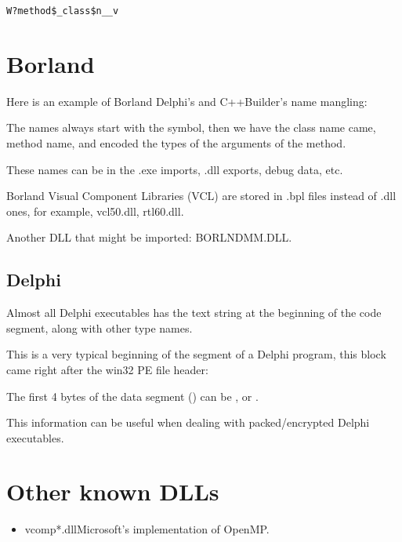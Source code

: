 \begin{lstlisting}
W?method$_class$n__v
\end{lstlisting}

\section{Borland}

Here is an example of Borland Delphi's and C++Builder's \gls{name mangling}:



The names always start with the  
symbol, then we have the class name came, method name, and encoded the types of the arguments of the method.

These names can be in the .exe imports, .dll exports, debug data, etc.

Borland Visual Component Libraries (VCL) 
are stored in .bpl files instead of .dll ones, for example, vcl50.dll, rtl60.dll.

Another DLL that might be imported: BORLNDMM.DLL.

\subsection{Delphi}

Almost all Delphi executables has the  text string at the beginning of the code segment, along with other type names.

This is a very typical beginning of the  
segment of a Delphi program, this block came right after the win32 PE file header:



The first 4 bytes of the data segment () can be ,  or .%

This information can be useful when dealing with packed/encrypted Delphi executables.

\section{Other known DLLs}

\begin{itemize}
\item vcomp*.dll\EMDASH{}Microsoft's implementation of OpenMP.
\end{itemize}

